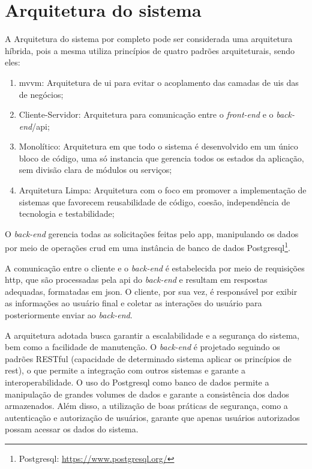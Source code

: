 \section{Arquitetura do sistema}\label{sec:arquitetura}
A Arquitetura do sistema por completo pode ser considerada uma arquitetura híbrida, pois a mesma utiliza princípios de quatro padrões arquiteturais, sendo eles:

\begin{enumerate}
   \item \ac{mvvm}: Arquitetura de \ac{ui} para evitar o acoplamento das camadas de \acp{ui} das de negócios;
   \item Cliente-Servidor: Arquitetura para comunicação entre o \textit{front-end} e o \textit{back-end}/\ac{api};
   \item Monolítico: Arquitetura em que todo o sistema é desenvolvido em um único bloco de código, uma só instancia que gerencia todos os estados da aplicação, sem divisão clara de módulos ou serviços;
   \item Arquitetura Limpa: Arquitetura com o foco em promover a implementação de sistemas que favorecem reusabilidade de código, coesão, independência de tecnologia e testabilidade;
 \end{enumerate}

O \textit{back-end} gerencia todas as solicitações feitas pelo \ac{app}, manipulando os dados por meio de operações \ac{crud} em uma instância de banco de dados Postgresql\footnote{\label{postgresql}Postgresql: \url{https://www.postgresql.org/}}.

A comunicação entre o cliente e o \textit{back-end} é estabelecida por meio de requisições \ac{http}, que são processadas pela \ac{api} do \textit{back-end} e resultam em respostas adequadas, formatadas em \ac{json}. O cliente, por sua vez, é responsável por exibir as informações ao usuário final e coletar as interações do usuário para posteriormente enviar ao \textit{back-end}.

A arquitetura adotada busca garantir a escalabilidade e a segurança do sistema, bem como a facilidade de manutenção. O \textit{back-end} é projetado seguindo os padrões RESTful (capacidade de determinado sistema aplicar os princípios de \ac{rest}), o que permite a integração com outros sistemas e garante a interoperabilidade. O uso do Postgresql como banco de dados permite a manipulação de grandes volumes de dados e garante a consistência dos dados armazenados. Além disso, a utilização de boas práticas de segurança, como a autenticação e autorização de usuários, garante que apenas usuários autorizados possam acessar os dados do sistema.

